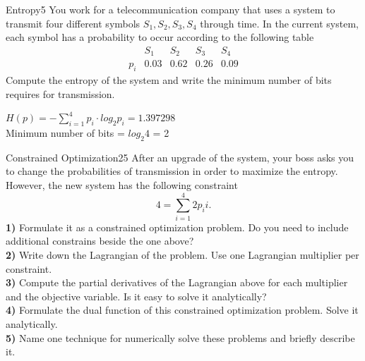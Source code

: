 \newif\ifvimbug
\vimbugfalse

\ifvimbug



\fi

 

\begin{questions}



\begin{question}{Entropy}{5}
You work for a telecommunication company that uses a system to transmit four different symbols ${S_1, S_2, S_3, S_4}$ through time. 
In the current system, each symbol has a probability to occur according to the following table 
\begin{equation*}
\begin{array}{c|c|c|c|c}
 & S_1 & S_2 & S_3 & S_4 \\
\hline
p_i & 0.03    & 0.62    & 0.26    & 0.09
\end{array}
\end{equation*}
Compute the entropy of the system and write the minimum number of bits requires for transmission.

\begin{answer}
$ H(p) = - \sum_{i=1}^{4}p_i \cdot log_2 p_i = 1.397298 $ \\
Minimum number of bits = $log_2 4$ = 2
\end{answer}

\end{question}


\begin{question}{Constrained Optimization}{25}
After an upgrade of the system, your boss asks you to change the probabilities of transmission in order to maximize the entropy. However, the new system has the following constraint
\begin{equation*}
    4 = \sum_{i=1}^4 2p_i i.
\end{equation*}
\textbf{1)} Formulate it as a constrained optimization problem. Do you need to include additional constrains beside the one above?
\\
\textbf{2)} Write down the Lagrangian of the problem. Use one Lagrangian multiplier per constraint.
\\
\textbf{3)} Compute the partial derivatives of the Lagrangian above for each multiplier and the objective variable. Is it easy to solve it analytically? 
\\
\textbf{4)} Formulate the dual function of this constrained optimization problem. Solve it analytically.
\\
\textbf{5)} Name one technique for numerically solve these problems and briefly describe it.


\end{question}
\end{questions}
